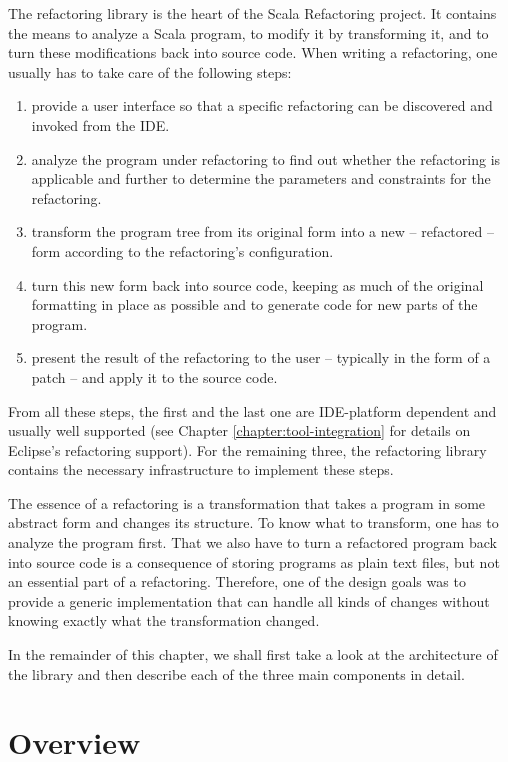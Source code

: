 
The refactoring library is the heart of the Scala Refactoring project. It contains the means to analyze a Scala program, to modify it by transforming it, and to turn these modifications back into source code. When writing a refactoring, one usually has to take care of the following steps:

\begin{enumerate}
 \item provide a user interface so that a specific refactoring can be discovered and invoked from the IDE.
 \item analyze the program under refactoring to find out whether the refactoring is applicable and further to determine the parameters and constraints for the refactoring.
 \item transform the program tree from its original form into a new -- refactored -- form according to the refactoring's configuration.
 \item turn this new form back into source code, keeping as much of the original formatting in place as possible and to generate code for new parts of the program.
 \item present the result of the refactoring to the user -- typically in the form of a patch --  and apply it to the source code.
\end{enumerate}

From all these steps, the first and the last one are IDE-platform dependent and usually well supported (see Chapter \ref{chapter:tool-integration} for details on Eclipse's refactoring support). For the remaining three, the refactoring library contains the necessary infrastructure to implement these steps.

The essence of a refactoring is a transformation that takes a program in some abstract form and changes its structure. To know what to transform, one has to analyze the program first. That we also have to turn a refactored program back into source code is a consequence of storing programs as plain text files, but not an essential part of a refactoring. Therefore, one of the design goals was to provide a generic implementation that can handle all kinds of changes without knowing exactly what the transformation changed.

In the remainder of this chapter, we shall first take a look at the architecture of the library and then describe each of the three main components in detail.

\section{Overview}

